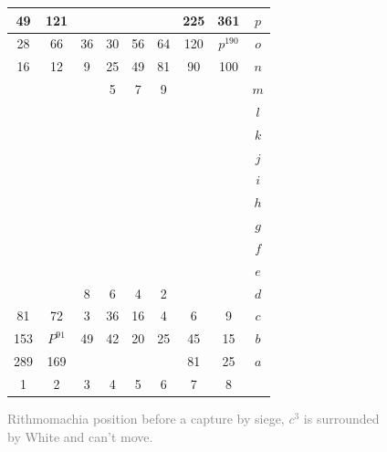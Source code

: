 \documentclass[14pt]{extarticle}
\begin{document}
\begin{figure}[H] 
\centering
\begin{tabular}{|c|c|c|c|c|c|c|c||c} \hline
\squadfill{\,}49 & \squadfill{\,}121 & \quad  & \quad  & \quad  & \quad  & \squadfill{\,}225 & \squadfill{\,}361 & $p$ \\ \hline
\squadfill{\,}28 & \squadfill{\,}66 & \trianglepafill{\,}36 & \trianglepafill{\,}30 & \trianglepafill{\,}56 & \trianglepafill{\,}64 & \squadfill{\,}120 & \rhombusfill{\,}$p^{190}$ & $o$ \\ \hline
\trianglepafill{\,}16 & \trianglepafill{\,}12 & \circletfill{\,}9 & \circletfill{\,}25 & \circletfill{\,}49 & \circletfill{\,}81 & \trianglepafill{\,}90 & \trianglepafill{\,}100 & $n$ \\ \hline
\quad  & \quad  & \quad  & \circletfill{\,}5 & \circletfill{\,}7 & \circletfill{\,}9 & \quad  & \quad  & $m$ \\ \hline
\quad  & \quad  & \quad  & \quad  & \quad  & \quad  & \quad  & \quad  & $l$ \\ \hline
\quad  & \quad  & \quad  & \quad  & \quad  & \quad  & \quad  & \quad  & $k$ \\ \hline
\quad  & \quad  & \quad  & \quad  & \quad  & \quad  & \quad  & \quad  & $j$ \\ \hline
\quad  & \quad  & \quad  & \quad  & \quad  & \quad  & \quad  & \quad  & $i$ \\ \hline
\quad  & \quad  & \quad  & \quad  & \quad  & \quad  & \quad  & \quad  & $h$ \\ \hline
\quad  & \quad  & \quad  & \quad  & \quad  & \quad  & \quad  & \quad  & $g$ \\ \hline
\quad  & \quad  & \quad  & \quad  & \quad  & \quad  & \quad  & \quad  & $f$ \\ \hline
\quad  & \quad  & \quad  & \quad  & \quad  & \quad  & \quad  & \quad  & $e$ \\ \hline
\quad  & \quad  & \circlet{\,}8 & \circlet{\,}6 & \circlet{\,}4 & \circlet{\,}2 & \quad  & \quad  & $d$ \\ \hline
\trianglepa{\,}81 & \trianglepa{\,}72 & \circletfill{\,}3 & \circlet{\,}36 & \circlet{\,}16 & \circlet{\,}4 & \trianglepa{\,}6 & \trianglepa{\,}9 & $c$ \\ \hline
\squad{\,}153 & \rhombus{\,}$P^{91}$ & \trianglepa{\,}49 & \trianglepa{\,}42 & \trianglepa{\,}20 & \trianglepa{\,}25 & \squad{\,}45 & \squad{\,}15 & $b$ \\ \hline
\squad{\,}289 & \squad{\,}169 & \quad  & \quad  & \quad  & \quad  & \squad{\,}81 & \squad{\,}25 & $a$ \\ \hline
1 &  2 &  3 &  4 &  5 &  6 &  7 &  8  &  \\
\end{tabular}  
\caption{\textcolor{gray}{Rithmomachia position before a capture by siege, $c^3$ is surrounded by White and can't move.}}
\label{fig:rithmomachia-capture-by-siege-with-pyramid3} 
\end{figure}
\end{document}
